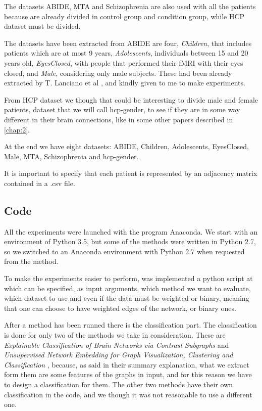 The datasets ABIDE, MTA and Schizophrenia are also used with all the patients because are already divided in control group and condition group, while HCP dataset must be divided. 
\vspace{0.5cm}

The datasets have been extracted from ABIDE are four, \textit{Children}, that includes patients which are at most 9 years, \textit{Adolescents}, individuals between 15 and 20 years old, \textit{EyesClosed}, with people that performed their fMRI with their eyes closed, and \textit{Male}, considering only male subjects. These had been already extracted by T. Lanciano et al \cite{lanciano2020cs}, and kindly given to me to make experiments.
\vspace{0.5cm}

From HCP dataset we though that could be interesting to divide male and female patients, dataset that we will call hcp-gender, to see if they are in some way different in their brain connections, like in some other papers described in \ref{chap:2}. 
\vspace{0.5cm}

At the end we have eight datasets: ABIDE, Children, Adolescents, EyesClosed, Male, MTA, Schizophrenia and hcp-gender. 
\vspace{0.5cm}

It is important to specify that each patient is represented by an adjacency matrix contained in a .csv file.

\subsection{Code}
All the experiments were launched with the program Anaconda. We start with an environment of Python 3.5, but some of the methods were written in Python 2.7, so we switched to an Anaconda environment with Python 2.7 when requested from the method.
\vspace{0.5cm}

To make the experiments easier to perform, was implemented a python script at which can be specified, as input arguments, which method we want to evaluate, which dataset to use and even if the data must be weighted or binary, meaning that one can choose to have weighted edges of the network, or binary ones.
\vspace{0.5cm}

After a method has been runned there is the classification part. The classification is done for only two of the methods we take in consideration. These are \textit{Explainable Classification of Brain Networks via Contrast Subgraphs} \cite{lanciano2020cs} and \textit{Unsupervised Network Embedding for Graph Visualization, Clustering and Classification} \cite{GutierrezUn}, because, as said in their summary explanation, what we extract form them are some features of the graphs in input, and for this reason we have to design a classification for them. The other two methods have their own classification in the code, and we though it was not reasonable to use a different one.
\vspace{0.5cm}


